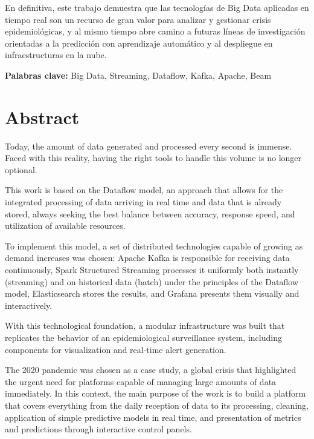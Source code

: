 \documentclass[12pt,a4paper]{article}
\begin{document}
En definitiva, este trabajo demuestra que las tecnologías de Big Data aplicadas en tiempo real son un recurso de gran valor para analizar y gestionar crisis epidemiológicas, y al mismo tiempo abre camino a futuras líneas de investigación orientadas a la predicción con aprendizaje automático y al despliegue en infraestructuras en la nube.

\textbf{Palabras clave:} Big Data, Streaming, Dataflow, Kafka, Apache, Beam

\newpage

\section*{Abstract}

Today, the amount of data generated and processed every second is immense. Faced with this reality, having the right tools to handle this volume is no longer optional.

This work is based on the Dataflow model, an approach that allows for the integrated processing of data arriving in real time and data that is already stored, always seeking the best balance between accuracy, response speed, and utilization of available resources.

To implement this model, a set of distributed technologies capable of growing as demand increases was chosen: Apache Kafka is responsible for receiving data continuously, Spark Structured Streaming processes it uniformly both instantly (streaming) and on historical data (batch) under the principles of the Dataflow model, Elasticsearch stores the results, and Grafana presents them visually and interactively.

With this technological foundation, a modular infrastructure was built that replicates the behavior of an epidemiological surveillance system, including components for visualization and real-time alert generation.

The 2020 pandemic was chosen as a case study, a global crisis that highlighted the urgent need for platforms capable of managing large amounts of data immediately. In this context, the main purpose of the work is to build a platform that covers everything from the daily reception of data to its processing, cleaning, application of simple predictive models in real time, and presentation of metrics and predictions through interactive control panels.
\end{document}
